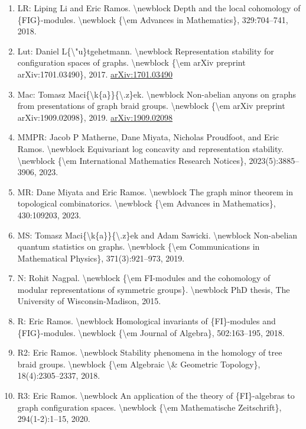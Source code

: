 \documentclass[11pt]{article}
\begin{document}
\begin{enumerate}[leftmargin=*]
  \item LR: Liping Li and Eric Ramos. \textbackslash{}newblock Depth and the local cohomology of \{FIG\}-modules. \textbackslash{}newblock \{\textbackslash{}em Advances in Mathematics\}, 329:704--741, 2018.
  \item Lut: Daniel L\{\textbackslash{}"u\}tgehetmann. \textbackslash{}newblock Representation stability for configuration spaces of graphs. \textbackslash{}newblock \{\textbackslash{}em arXiv preprint arXiv:1701.03490\}, 2017. \href{https://arxiv.org/abs/1701.03490}{arXiv:1701.03490}
  \item Mac: Tomasz Maci\{\textbackslash{}k\{a\}\}\{\textbackslash{}.z\}ek. \textbackslash{}newblock Non-abelian anyons on graphs from presentations of graph braid groups. \textbackslash{}newblock \{\textbackslash{}em arXiv preprint arXiv:1909.02098\}, 2019. \href{https://arxiv.org/abs/1909.02098}{arXiv:1909.02098}
  \item MMPR: Jacob P Matherne, Dane Miyata, Nicholas Proudfoot, and Eric Ramos. \textbackslash{}newblock Equivariant log concavity and representation stability. \textbackslash{}newblock \{\textbackslash{}em International Mathematics Research Notices\}, 2023(5):3885--3906, 2023.
  \item MR: Dane Miyata and Eric Ramos. \textbackslash{}newblock The graph minor theorem in topological combinatorics. \textbackslash{}newblock \{\textbackslash{}em Advances in Mathematics\}, 430:109203, 2023.
  \item MS: Tomasz Maci\{\textbackslash{}k\{a\}\}\{\textbackslash{}.z\}ek and Adam Sawicki. \textbackslash{}newblock Non-abelian quantum statistics on graphs. \textbackslash{}newblock \{\textbackslash{}em Communications in Mathematical Physics\}, 371(3):921--973, 2019.
  \item N: Rohit Nagpal. \textbackslash{}newblock \{\textbackslash{}em FI-modules and the cohomology of modular representations of symmetric groups\}. \textbackslash{}newblock PhD thesis, The University of Wisconsin-Madison, 2015.
  \item R: Eric Ramos. \textbackslash{}newblock Homological invariants of \{FI\}-modules and \{FIG\}-modules. \textbackslash{}newblock \{\textbackslash{}em Journal of Algebra\}, 502:163--195, 2018.
  \item R2: Eric Ramos. \textbackslash{}newblock Stability phenomena in the homology of tree braid groups. \textbackslash{}newblock \{\textbackslash{}em Algebraic \textbackslash{}\& Geometric Topology\}, 18(4):2305--2337, 2018.
  \item R3: Eric Ramos. \textbackslash{}newblock An application of the theory of \{FI\}-algebras to graph configuration spaces. \textbackslash{}newblock \{\textbackslash{}em Mathematische Zeitschrift\}, 294(1-2):1--15, 2020.

\end{enumerate}
\end{document}
